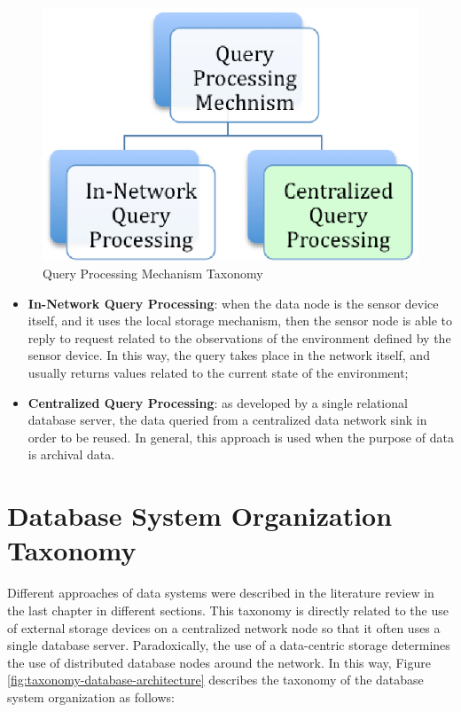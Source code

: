 \begin{figure}[h]
  \centering
  \includegraphics{../diagrams/taxonomy-query-mechanism}
  \caption{Query Processing Mechanism Taxonomy}
  \label{fig:taxonomy-query-mechanism}
\end{figure}

\begin{itemize}
  \item \textbf{In-Network Query Processing}: when the data node is the
  sensor device itself, and it uses the local storage mechanism, then the
  sensor node is able to reply to request related to the observations of the 
  environment defined by the sensor device. In this way, the query takes 
  place in the network itself, and usually returns values related to the current
  state of the environment;
  \item \textbf{Centralized Query Processing}: as developed by a single 
  relational database server, the data queried from a centralized data
  network sink in order to be reused. In general, this approach is used when
  the purpose of data is archival data.
\end{itemize}

\section{Database System Organization Taxonomy}

Different approaches of data systems were described in the literature review in
the last chapter in different sections. This taxonomy is directly related to
the use of external storage devices on a centralized network node so that it
often uses a single database server. Paradoxically, the use of a data-centric
storage determines the use of distributed database nodes around the network. 
In this way, Figure \ref{fig:taxonomy-database-architecture} describes the
taxonomy of the database system organization as follows:

